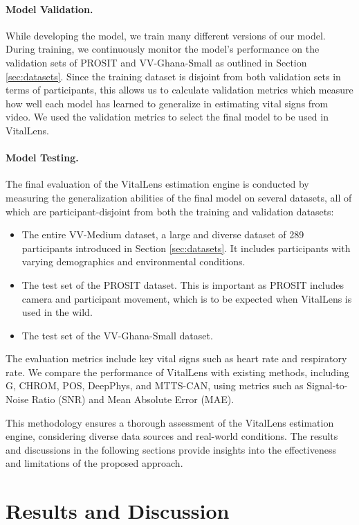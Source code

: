 \documentclass{article}
\begin{document}
\paragraph{Model Validation.}
While developing the model, we train many different versions of our model.
During training, we continuously monitor the model's performance on the validation sets of PROSIT and VV-Ghana-Small as outlined in Section \ref{sec:datasets}.
Since the training dataset is disjoint from both validation sets in terms of participants, this allows us to calculate validation metrics which measure how well each model has learned to generalize in estimating vital signs from video.
We used the validation metrics to select the final model to be used in VitalLens.

\paragraph{Model Testing.}
The final evaluation of the VitalLens estimation engine is conducted by measuring the generalization abilities of the final model on several datasets, all of which are participant-disjoint from both the training and validation datasets:

\begin{itemize}
	\item The entire VV-Medium dataset, a large and diverse dataset of 289 participants introduced in Section \ref{sec:datasets}. It includes participants with varying demographics and environmental conditions.
	\item The test set of the PROSIT dataset. This is important as PROSIT includes camera and participant movement, which is to be expected when VitalLens is used in the wild.
	\item The test set of the VV-Ghana-Small dataset.
\end{itemize}

The evaluation metrics include key vital signs such as heart rate and respiratory rate. We compare the performance of VitalLens with existing methods, including G, CHROM, POS, DeepPhys, and MTTS-CAN, using metrics such as Signal-to-Noise Ratio (SNR) and Mean Absolute Error (MAE).

This methodology ensures a thorough assessment of the VitalLens estimation engine, considering diverse data sources and real-world conditions.
The results and discussions in the following sections provide insights into the effectiveness and limitations of the proposed approach.

\section{Results and Discussion}
\label{sec:results}
\end{document}
